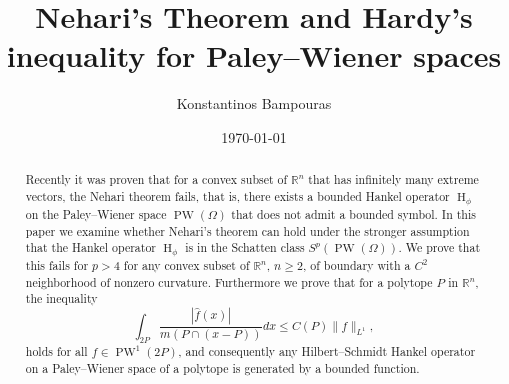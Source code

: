\documentclass[footinclude=true]{amsart}
\title{Nehari's Theorem and Hardy's inequality for Paley--Wiener spaces}
\author{Konstantinos Bampouras}
\date{\today}
\theoremstyle{plain}
\DeclareMathOperator{\Ha}{H}
\DeclareMathOperator{\PW}{PW}
\begin{document}
	
	
	\maketitle
	\begin{abstract}
		Recently it was proven that for a convex subset of $\mathbb{R}^{n}$ that has infinitely many extreme vectors, the Nehari theorem fails, that is, there exists a bounded Hankel operator $\Ha_{\phi}$ on the Paley--Wiener space $\PW(\Omega)$ that does not admit a bounded symbol. In this paper we examine whether Nehari's theorem can hold under the stronger assumption that the Hankel operator $\Ha_{\phi}$ is in the Schatten class $S^{p}(\PW(\Omega))$. We prove that this fails for $p>4$ for any convex subset of $\mathbb{R}^{n}$, $n\geq2$, of boundary with a $C^{2}$ neighborhood of nonzero curvature. Furthermore we prove that for a polytope $P$ in $\mathbb{R}^{n}$, the inequality $$\int_{2P}\dfrac{|\widehat{f}(x)|}{m(P\cap (x-P))}dx\leq C(P)\|f\|_{L^{1}},$$ holds for all $f\in \PW^{1}(2P)$, and consequently any Hilbert--Schmidt Hankel operator on a Paley--Wiener space of a polytope is generated by a bounded function.
	\end{abstract}
\end{document}
